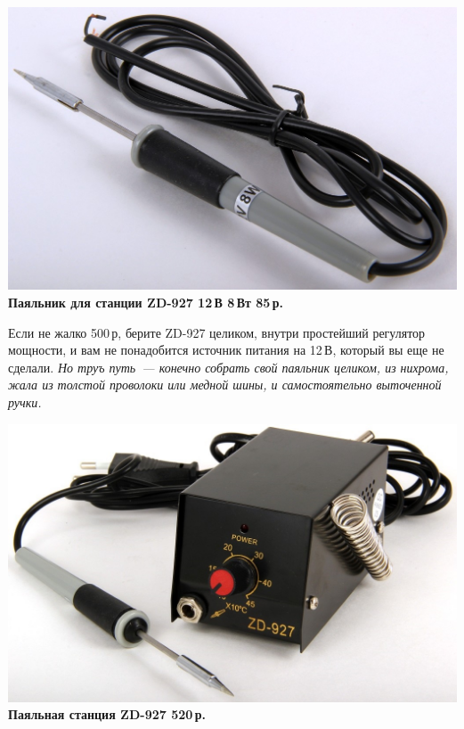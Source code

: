 {\begin{multicols}{2}
\noindent\href{http://voltmaster-samara.ru/catalog/product/00047380/}{
\includegraphics[width=\columnwidth]{00/fig/Iron8W.jpg}}
\textbf{Паяльник для станции ZD-927 12\,В 8\,Вт 85\,р.}
\end{multicols}


\begin{multicols}{2}
Если не жалко 500\,р, берите ZD-927 целиком, внутри простейший регулятор
мощности, и вам не понадобится источник питания на 12\,В, который вы еще не
сделали. \emph{Но труъ путь\ --- конечно собрать свой паяльник целиком, из
нихрома, жала из толстой проволоки или медной шины, и самостоятельно выточенной
ручки.}

\columnbreak

\noindent\href{http://voltmaster-samara.ru/catalog/product/00073790/}{
\includegraphics[width=\columnwidth]{00/fig/ZD927.jpg}}
\textbf{Паяльная станция ZD-927 520\,р.}
\end{multicols}

}
